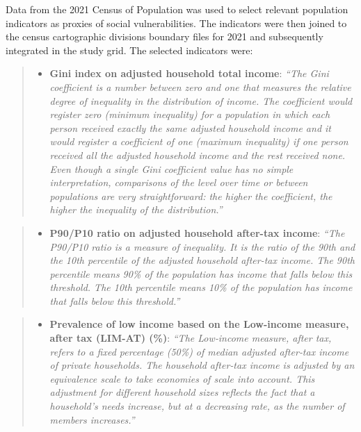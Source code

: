 \documentclass[preprint, 3p,
authoryear]{elsarticle} %
\providecommand{\tightlist}{%
  \setlength{\itemsep}{0pt}\setlength{\parskip}{0pt}}
\begin{document}
Data from the 2021 Census of Population \citep{statisticscanada2021a}
was used to select relevant population indicators as proxies of social
vulnerabilities. The indicators were then joined to the census
cartographic divisions boundary files for 2021
\citep{statisticscanada2022f, statisticscanada2022} and subsequently
integrated in the study grid. The selected indicators were:

\begin{quote}
\begin{itemize}
\tightlist
\item
  \textbf{Gini index on adjusted household total income}: \emph{``The
  Gini coefficient is a number between zero and one that measures the
  relative degree of inequality in the distribution of income. The
  coefficient would register zero (minimum inequality) for a population
  in which each person received exactly the same adjusted household
  income and it would register a coefficient of one (maximum inequality)
  if one person received all the adjusted household income and the rest
  received none. Even though a single Gini coefficient value has no
  simple interpretation, comparisons of the level over time or between
  populations are very straightforward: the higher the coefficient, the
  higher the inequality of the distribution.''}
\end{itemize}
\end{quote}

\begin{quote}
\begin{itemize}
\tightlist
\item
  \textbf{P90/P10 ratio on adjusted household after-tax income}:
  \emph{``The P90/P10 ratio is a measure of inequality. It is the ratio
  of the 90th and the 10th percentile of the adjusted household
  after-tax income. The 90th percentile means 90\% of the population has
  income that falls below this threshold. The 10th percentile means 10\%
  of the population has income that falls below this threshold.''}
\end{itemize}
\end{quote}

\begin{quote}
\begin{itemize}
\tightlist
\item
  \textbf{Prevalence of low income based on the Low-income measure,
  after tax (LIM-AT) (\%)}: \emph{``The Low‑income measure, after tax,
  refers to a fixed percentage (50\%) of median adjusted after‑tax
  income of private households. The household after‑tax income is
  adjusted by an equivalence scale to take economies of scale into
  account. This adjustment for different household sizes reflects the
  fact that a household's needs increase, but at a decreasing rate, as
  the number of members increases.''}
\end{itemize}
\end{quote}
\end{document}
